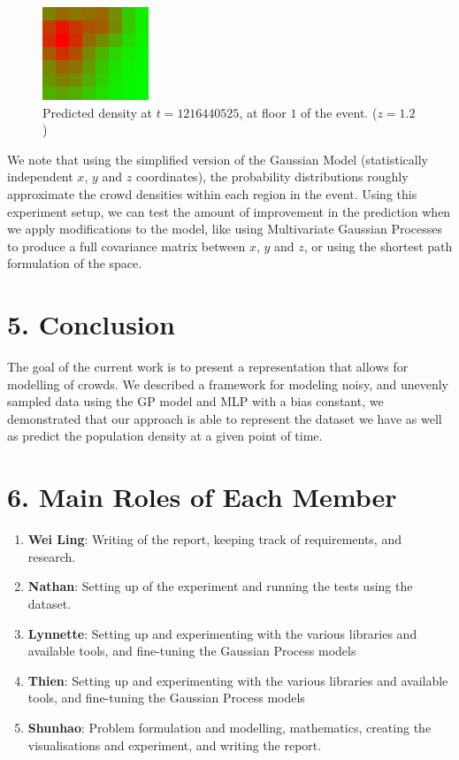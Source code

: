 \documentclass[letterpaper]{article}
\begin{document}
\begin{figure}[h!]
  \centering
    \includegraphics[width=120px,natwidth=320,natheight=280]{selected_renders/1_1216440525p.png}
  \caption{Predicted density at $t=1216440525$, at floor $1$ of the event. ($z = 1.2$)}
  \label{fig:t4dist}
\end{figure}

We note that using the simplified version of the Gaussian Model (statistically independent $x$, $y$ and $z$ coordinates), the probability distributions roughly approximate the crowd densities within each region in the event. Using this experiment setup, we can test the amount of improvement in the prediction when we apply modifications to the model, like using Multivariate Gaussian Processes to produce a full covariance matrix between $x$, $y$ and $z$, or using the shortest path formulation of the space.

\section{5.  Conclusion}

The goal of the current work is to present a representation that allows for modelling of crowds. We described a framework for modeling noisy, and unevenly sampled
data using the GP model and MLP with a bias constant, we demonstrated that our approach is able to represent the dataset we have as well as predict the population density at a given point of time.

\section{6. Main Roles of Each Member}
\begin{enumerate}
\item \textbf{Wei Ling}: 
Writing of the report, keeping track of requirements, and research.
\item \textbf{Nathan}: 
Setting up of the experiment and running the tests using the dataset.
\item \textbf{Lynnette}: 
Setting up and experimenting with the various libraries and available tools, and fine-tuning the Gaussian Process models
\item \textbf{Thien}: 
Setting up and experimenting with the various libraries and available tools, and fine-tuning the Gaussian Process models
\item \textbf{Shunhao}: 
Problem formulation and modelling, mathematics, creating the visualisations and experiment, and writing the report.
\end{enumerate}
\end{document}
